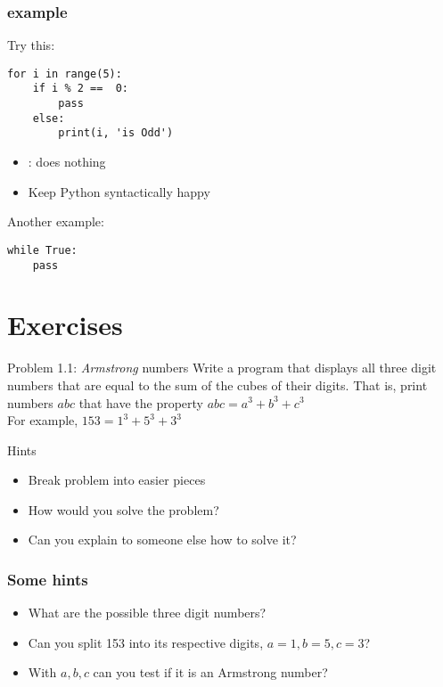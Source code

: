 \documentclass[14pt,compress]{beamer}
\begin{document}
\begin{frame}[fragile]
  \frametitle{ example}
Try this:
\begin{lstlisting}
for i in range(5):
    if i % 2 ==  0:
        pass
    else:
        print(i, 'is Odd')
\end{lstlisting}
\begin{itemize}
\item {}: does nothing
\item Keep Python syntactically happy
\end{itemize}
Another example:
\begin{lstlisting}
while True:
    pass
\end{lstlisting}
\end{frame}



\section{Exercises}

\begin{frame}{Problem 1.1: \emph{Armstrong} numbers}
  Write a program that displays all three digit numbers that are equal to the sum of the cubes of their digits. That is, print numbers $abc$ that have the property $abc = a^3 + b^3 + c^3$\\
For example, $153 = 1^3 + 5^3 + 3^3$\\
\vspace*{0.2in}

\begin{block}{Hints}
  \begin{itemize}
  \item Break problem into easier pieces
  \item How would you solve the problem?
  \item Can you explain to someone else how to solve it?
  \end{itemize}
\end{block}
\end{frame}

\begin{frame}[fragile]
  \frametitle{Some hints}
  \begin{itemize}
  \item What are the possible three digit numbers?
  \item Can you split 153 into its respective digits, $a=1, b=5, c=3$?
  \item With $a, b, c$ can you test if it is an Armstrong number?
  \end{itemize}
\end{frame}
\end{document}
